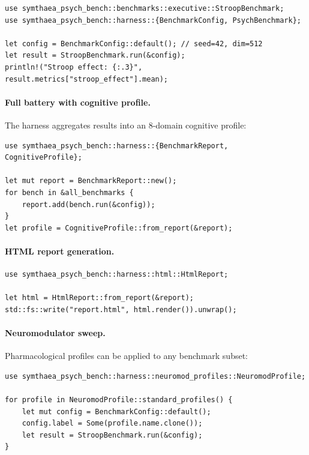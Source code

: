 \documentclass[10pt,landscape]{article}
\begin{document}
\begin{verbatim}
use symthaea_psych_bench::benchmarks::executive::StroopBenchmark;
use symthaea_psych_bench::harness::{BenchmarkConfig, PsychBenchmark};

let config = BenchmarkConfig::default(); // seed=42, dim=512
let result = StroopBenchmark.run(&config);
println!("Stroop effect: {:.3}", result.metrics["stroop_effect"].mean);
\end{verbatim}

\paragraph{Full battery with cognitive profile.} The harness aggregates results into an 8-domain cognitive profile:

\begin{verbatim}
use symthaea_psych_bench::harness::{BenchmarkReport, CognitiveProfile};

let mut report = BenchmarkReport::new();
for bench in &all_benchmarks {
    report.add(bench.run(&config));
}
let profile = CognitiveProfile::from_report(&report);
\end{verbatim}

\paragraph{HTML report generation.}

\begin{verbatim}
use symthaea_psych_bench::harness::html::HtmlReport;

let html = HtmlReport::from_report(&report);
std::fs::write("report.html", html.render()).unwrap();
\end{verbatim}

\paragraph{Neuromodulator sweep.} Pharmacological profiles can be applied to any benchmark subset:

\begin{verbatim}
use symthaea_psych_bench::harness::neuromod_profiles::NeuromodProfile;

for profile in NeuromodProfile::standard_profiles() {
    let mut config = BenchmarkConfig::default();
    config.label = Some(profile.name.clone());
    let result = StroopBenchmark.run(&config);
}
\end{verbatim}
\end{document}
